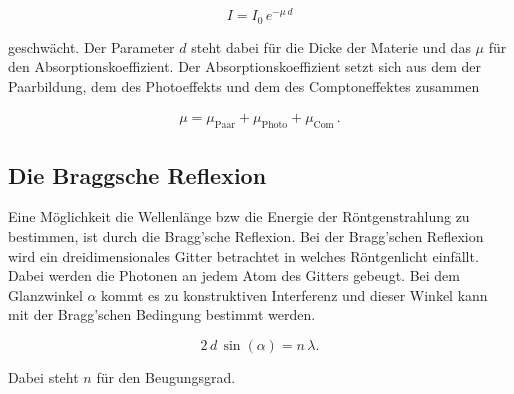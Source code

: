 \begin{equation}
    I = I_{0}\,e^{-\mu\, d } \label{2}
\end{equation}

\begin{flushleft}
    geschwächt. 
    Der Parameter $d$ steht dabei für die Dicke der Materie und das $\mu$ für den Absorptionskoeffizient. 
    Der Absorptionskoeffizient setzt sich aus dem der Paarbildung, dem des Photoeffekts und dem des Comptoneffektes zusammen  
\end{flushleft}

\begin{align*}
    \mu = \mu_{\text{Paar}} + \mu_{\text{Photo}} + \mu_{\text{Com}}\,.
\end{align*}

\newpage

\subsection{Die Braggsche Reflexion}

\begin{flushleft}
    Eine Möglichkeit die Wellenlänge bzw die Energie der Röntgenstrahlung zu bestimmen, ist durch die Bragg'sche Reflexion.
    Bei der Bragg'schen Reflexion wird ein dreidimensionales Gitter betrachtet in welches Röntgenlicht einfällt. 
    Dabei werden die Photonen an jedem Atom des Gitters gebeugt. 
    Bei dem Glanzwinkel $\alpha$ kommt es zu konstruktiven Interferenz und dieser Winkel kann mit der Bragg'schen Bedingung bestimmt werden.    
\end{flushleft}

\begin{equation}
    2\,d\,\sin(\alpha) = n\, \lambda. \label{3}
\end{equation}

\begin{flushleft}
    Dabei steht $n$ für den Beugungsgrad. 
\end{flushleft}